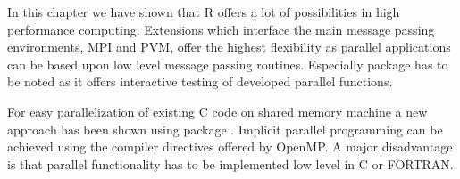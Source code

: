 In this chapter we have shown that R offers a lot of possibilities in
high performance computing. Extensions which interface the main
message passing environments, MPI and PVM, offer the highest
flexibility as parallel applications can be based upon low level
message passing routines. Especially package  has to be
noted as it offers interactive testing of developed parallel
functions. 

For easy parallelization of existing C code on shared memory machine a
new approach has been shown using package . Implicit
parallel programming can be achieved using the compiler directives
offered by OpenMP. A major disadvantage is that parallel functionality
has to be implemented low level in C or FORTRAN.
